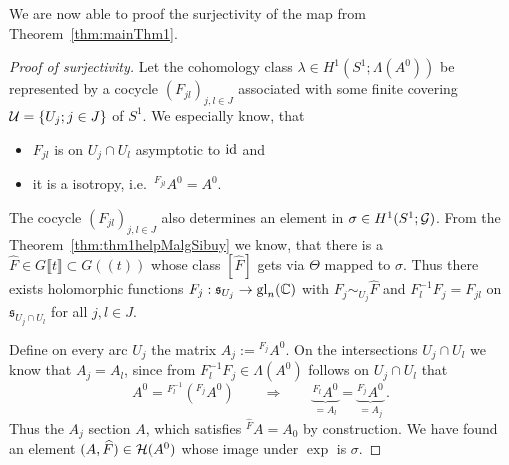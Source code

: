 We are now able to proof the surjectivity of the map from
Theorem~\ref{thm:mainThm1}.
\begin{proof}[Proof of surjectivity]
  Let the cohomology class $\lambda\in H^1(S^1;\Lambda(A^0))$ be represented by
  a cocycle $(F_{jl})_{j,l\in J}$ associated with some finite covering
  $\mathcal{U}=\{U_j;j\in J\}$ of $S^1$. We especially know, that
  \begin{itemize}
    \item $F_{jl}$ is on $U_j\cap U_l$ asymptotic to $\operatorname{id}$ and
    \item it is a isotropy, i.e.\  ${}^{F_{jl}}A^0=A^0$.
  \end{itemize}
  The cocycle $(F_{jl})_{j,l\in J}$ also determines an element in
  $\sigma\in H^1(S^1;\mathcal{G})$.
  From the Theorem~\ref{thm:thm1helpMalgSibuy} we know, that there is a $\hat
  F\in G\llbracket t\rrbracket\subset G(\!(t)\!)$ whose class $[\hat F]$ gets
  via $\Theta$ mapped to $\sigma$.
  Thus there exists holomorphic functions $F_j:\mathfrak{s}_{U_j}\to\operatorname{gl}_n(\mathbb{C})$ 
  with $F_j\sim_{U_j}\hat F$ and $F_l^{-1}F_j=F_{jl}$ on
  $\mathfrak{s}_{U_j\cap U_l}$ for all $j,l\in J$.

  Define on every arc $U_j$ the matrix $A_j:={}^{F_j}A^0$.
  On the intersections $U_j\cap U_l$ we know that $A_j=A_l$, since
  from $F_l^{-1}F_j\in\Lambda(A^0)$ follows on $U_j\cap U_l$ that
  \[
    A^0={}^{F_l^{-1}}({}^{F_j}A^0)
    \qquad\Longrightarrow{}\qquad
    \underset{=A_l}{\underbrace{{}^{F_l}A^0}}
    =\underset{=A_j}{\underbrace{{}^{F_j}A^0}}
    \,.
  \]
  Thus the $A_j$  section $A$, which satisfies
  ${}^{\hat F}A=A_0$ by construction.
  We have found an element $(A,\widehat F)\in\mathcal{H}(A^0)$ whose image under $\exp$ is
  $\sigma$.
\end{proof}

